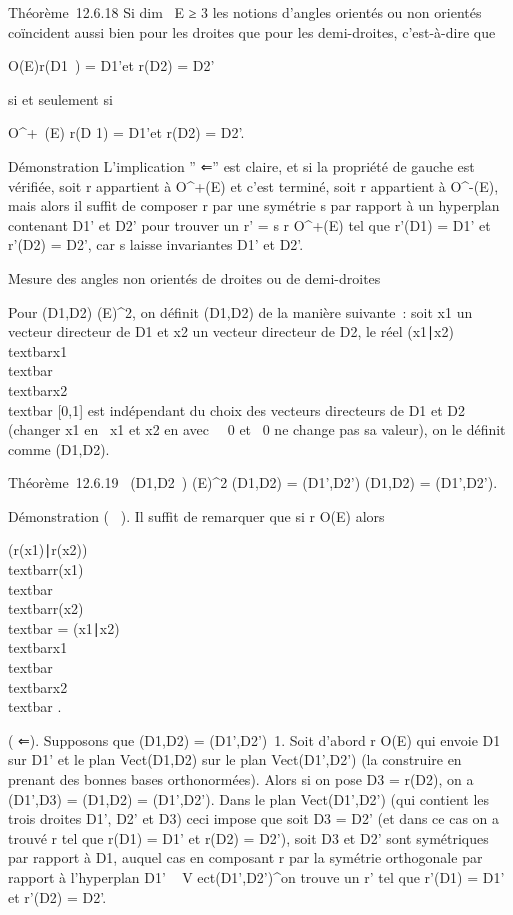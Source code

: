 Théorème~12.6.18 Si dim~ E ≥ 3 les notions
d'angles orientés ou non orientés coïncident aussi bien pour les droites
que pour les demi-droites, c'est-à-dire que

\existsr \in O(E)\quad r(D1~)
= D1'\text et r(D2) =
D2'

si et seulement si

\existsr \in O^+~(E)\quad
r(D 1) = D1'\text et
r(D2) = D2'.

Démonstration L'implication '' ⇐'' est claire, et si la propriété de
gauche est vérifiée, soit r appartient à O^+(E) et c'est
terminé, soit r appartient à O^-(E), mais alors il suffit de
composer r par une symétrie s par rapport à un hyperplan contenant
D1' et D2' pour trouver un r' = s \cdot r \in
O^+(E) tel que r'(D1) = D1' et
r'(D2) = D2', car s laisse invariantes D1'
et D2'.

Mesure des angles non orientés de droites ou de demi-droites

Pour (D1,D2) \inD(E)^2, on définit
\phi(D1,D2) de la manière suivante~: soit x1
un vecteur directeur de D1 et x2 un vecteur
directeur de D2, le réel 
\textbar{}(x1∣x2)\textbar{}
\over
\\textbar{}x1\\textbar{}
\\textbar{}x2\\textbar{} \in
{[}0,1{]} est indépendant du choix des vecteurs directeurs de
D1 et D2 (changer x1 en \lambda~x1 et
x2 en  avec \lambda~\neq~0 et
\mu\neq~0 ne change pas sa valeur), on le définit
comme \phi(D1,D2).

Théorème~12.6.19 \forall~(D1,D2~)
\inD(E)^2\quad
\overline(D1,D2) =
\overline(D1',D2')\quad
\Leftrightarrow \quad
\phi(D1,D2) = \phi(D1',D2').

Démonstration ( \rigtharrow~). Il suffit de remarquer que si r \in O(E) alors


\textbar{}(r(x1)∣r(x2))\textbar{}
\over
\\textbar{}r(x1)\\textbar{}
\\textbar{}r(x2)\\textbar{}
=
\textbar{}(x1∣x2)\textbar{}
\over
\\textbar{}x1\\textbar{}
\\textbar{}x2\\textbar{} .

( ⇐). Supposons que \phi(D1,D2) =
\phi(D1',D2')\neq~1. Soit
d'abord r \in O(E) qui envoie D1 sur D1' et le plan
Vect(D1,D2) sur le plan
Vect(D1',D2') (la construire en prenant des bonnes
bases orthonormées). Alors si on pose D3 = r(D2), on
a \phi(D1',D3) = \phi(D1,D2) =
\phi(D1',D2'). Dans le plan
Vect(D1',D2') (qui contient les trois droites
D1', D2' et D3) ceci impose que soit
D3 = D2' (et dans ce cas on a trouvé r tel que
r(D1) = D1' et r(D2) = D2'),
soit D3 et D2' sont symétriques par rapport à
D1, auquel cas en composant r par la symétrie orthogonale par
rapport à l'hyperplan D1' \oplus~ V
ect(D1',D2')^\bot on trouve un r' tel que
r'(D1) = D1' et r'(D2) = D2'.

